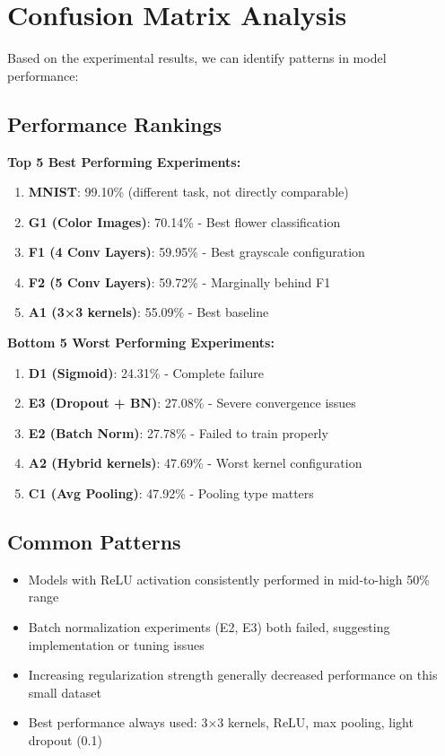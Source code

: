 \documentclass[12pt,a4paper]{article}
\begin{document}
\section{Confusion Matrix Analysis}

Based on the experimental results, we can identify patterns in model performance:

\subsection{Performance Rankings}
\textbf{Top 5 Best Performing Experiments:}
\begin{enumerate}
    \item \textbf{MNIST}: 99.10\% (different task, not directly comparable)
    \item \textbf{G1 (Color Images)}: 70.14\% - Best flower classification
    \item \textbf{F1 (4 Conv Layers)}: 59.95\% - Best grayscale configuration
    \item \textbf{F2 (5 Conv Layers)}: 59.72\% - Marginally behind F1
    \item \textbf{A1 (3×3 kernels)}: 55.09\% - Best baseline
\end{enumerate}

\textbf{Bottom 5 Worst Performing Experiments:}
\begin{enumerate}
    \item \textbf{D1 (Sigmoid)}: 24.31\% - Complete failure
    \item \textbf{E3 (Dropout + BN)}: 27.08\% - Severe convergence issues
    \item \textbf{E2 (Batch Norm)}: 27.78\% - Failed to train properly
    \item \textbf{A2 (Hybrid kernels)}: 47.69\% - Worst kernel configuration
    \item \textbf{C1 (Avg Pooling)}: 47.92\% - Pooling type matters
\end{enumerate}

\subsection{Common Patterns}
\begin{itemize}
    \item Models with ReLU activation consistently performed in mid-to-high 50\% range
    \item Batch normalization experiments (E2, E3) both failed, suggesting implementation or tuning issues
    \item Increasing regularization strength generally decreased performance on this small dataset
    \item Best performance always used: 3×3 kernels, ReLU, max pooling, light dropout (0.1)
\end{itemize}
\end{document}
